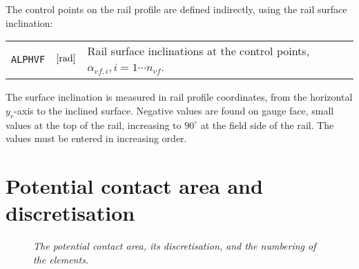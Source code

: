 \documentclass[12pt]{report}
\renewcommand{\magenta}[1]{}
\newenvironment{inputvars}{\vspace{0.4\baselineskip}%

\begin{tabular}{>{\raggedright}p{22mm}p{19mm}p{113mm}}}{
\end{tabular}

}
\newcommand{\inpvar}[3]{{\small\tt #1} & $#2$ & #3 \\[1ex]}
\begin{document}
The control points on the rail profile are defined indirectly, using the
rail surface inclination:
\begin{inputvars}
\inpvar{ALPHVF}{\bunit{rad}}{Rail surface inclinations at the control points,
        $\alpha_{vf,i}, i=1\cdots n_{vf}$.}
\end{inputvars}
The surface inclination is measured in rail profile coordinates, from the
horizontal $y_r$-axis to the inclined surface. Negative values are found on
gauge face, small values at the top of the rail, increasing to $90^\circ$ at
the field side of the rail. The values must be entered in increasing order.

\magenta{
Friction variation is supported in module 3 through option ${\tt V}=2$
(option ${\tt V}=1$ is not supported).
This requires that the parameters for the friction laws are given for each
row of the grid. This uses ${\tt NVF}={\tt MY}$ and avoids any
interpolation.
}

\section{Potential contact area and discretisation}
\label{sec:pot_con}

\begin{figure}[bt]
\centering
{}
\caption{\em The potential contact area, its discretisation, and the
        numbering of the elements.}
\label{fig:potcon_discr}
\end{figure}
\end{document}
